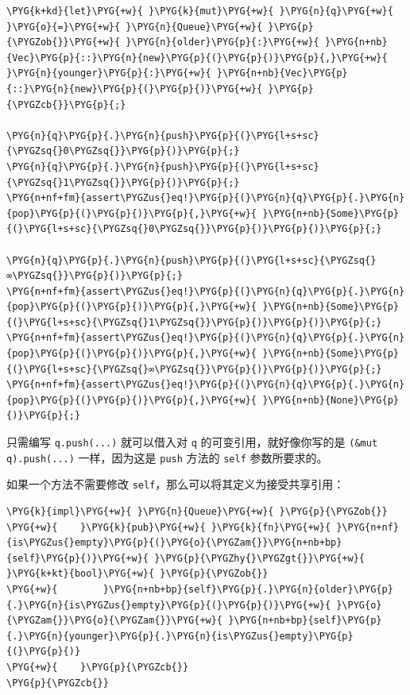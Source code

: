 \begin{Verbatim}[commandchars=\\\{\},breaklines=true,breakanywhere=true,fontsize=\codefont,xleftmargin=17bp]
\PYG{k+kd}{let}\PYG{+w}{ }\PYG{k}{mut}\PYG{+w}{ }\PYG{n}{q}\PYG{+w}{ }\PYG{o}{=}\PYG{+w}{ }\PYG{n}{Queue}\PYG{+w}{ }\PYG{p}{\PYGZob{}}\PYG{+w}{ }\PYG{n}{older}\PYG{p}{:}\PYG{+w}{ }\PYG{n+nb}{Vec}\PYG{p}{::}\PYG{n}{new}\PYG{p}{(}\PYG{p}{)}\PYG{p}{,}\PYG{+w}{ }\PYG{n}{younger}\PYG{p}{:}\PYG{+w}{ }\PYG{n+nb}{Vec}\PYG{p}{::}\PYG{n}{new}\PYG{p}{(}\PYG{p}{)}\PYG{+w}{ }\PYG{p}{\PYGZcb{}}\PYG{p}{;}

\PYG{n}{q}\PYG{p}{.}\PYG{n}{push}\PYG{p}{(}\PYG{l+s+sc}{\PYGZsq{}0\PYGZsq{}}\PYG{p}{)}\PYG{p}{;}
\PYG{n}{q}\PYG{p}{.}\PYG{n}{push}\PYG{p}{(}\PYG{l+s+sc}{\PYGZsq{}1\PYGZsq{}}\PYG{p}{)}\PYG{p}{;}
\PYG{n+nf+fm}{assert\PYGZus{}eq!}\PYG{p}{(}\PYG{n}{q}\PYG{p}{.}\PYG{n}{pop}\PYG{p}{(}\PYG{p}{)}\PYG{p}{,}\PYG{+w}{ }\PYG{n+nb}{Some}\PYG{p}{(}\PYG{l+s+sc}{\PYGZsq{}0\PYGZsq{}}\PYG{p}{)}\PYG{p}{)}\PYG{p}{;}

\PYG{n}{q}\PYG{p}{.}\PYG{n}{push}\PYG{p}{(}\PYG{l+s+sc}{\PYGZsq{}∞\PYGZsq{}}\PYG{p}{)}\PYG{p}{;}
\PYG{n+nf+fm}{assert\PYGZus{}eq!}\PYG{p}{(}\PYG{n}{q}\PYG{p}{.}\PYG{n}{pop}\PYG{p}{(}\PYG{p}{)}\PYG{p}{,}\PYG{+w}{ }\PYG{n+nb}{Some}\PYG{p}{(}\PYG{l+s+sc}{\PYGZsq{}1\PYGZsq{}}\PYG{p}{)}\PYG{p}{)}\PYG{p}{;}
\PYG{n+nf+fm}{assert\PYGZus{}eq!}\PYG{p}{(}\PYG{n}{q}\PYG{p}{.}\PYG{n}{pop}\PYG{p}{(}\PYG{p}{)}\PYG{p}{,}\PYG{+w}{ }\PYG{n+nb}{Some}\PYG{p}{(}\PYG{l+s+sc}{\PYGZsq{}∞\PYGZsq{}}\PYG{p}{)}\PYG{p}{)}\PYG{p}{;}
\PYG{n+nf+fm}{assert\PYGZus{}eq!}\PYG{p}{(}\PYG{n}{q}\PYG{p}{.}\PYG{n}{pop}\PYG{p}{(}\PYG{p}{)}\PYG{p}{,}\PYG{+w}{ }\PYG{n+nb}{None}\PYG{p}{)}\PYG{p}{;}
\end{Verbatim}

只需编写 \texttt{q.push(...)} 就可以借入对 \texttt{q} 的可变引用，就好像你写的是 \texttt{(\&mut q).push(...)} 一样，因为这是 \texttt{push} 方法的 \texttt{self} 参数所要求的。

如果一个方法不需要修改 \texttt{self}，那么可以将其定义为接受共享引用：

\begin{Verbatim}[commandchars=\\\{\},breaklines=true,breakanywhere=true,fontsize=\codefont,xleftmargin=17bp]
\PYG{k}{impl}\PYG{+w}{ }\PYG{n}{Queue}\PYG{+w}{ }\PYG{p}{\PYGZob{}}
\PYG{+w}{    }\PYG{k}{pub}\PYG{+w}{ }\PYG{k}{fn}\PYG{+w}{ }\PYG{n+nf}{is\PYGZus{}empty}\PYG{p}{(}\PYG{o}{\PYGZam{}}\PYG{n+nb+bp}{self}\PYG{p}{)}\PYG{+w}{ }\PYG{p}{\PYGZhy{}\PYGZgt{}}\PYG{+w}{ }\PYG{k+kt}{bool}\PYG{+w}{ }\PYG{p}{\PYGZob{}}
\PYG{+w}{        }\PYG{n+nb+bp}{self}\PYG{p}{.}\PYG{n}{older}\PYG{p}{.}\PYG{n}{is\PYGZus{}empty}\PYG{p}{(}\PYG{p}{)}\PYG{+w}{ }\PYG{o}{\PYGZam{}}\PYG{o}{\PYGZam{}}\PYG{+w}{ }\PYG{n+nb+bp}{self}\PYG{p}{.}\PYG{n}{younger}\PYG{p}{.}\PYG{n}{is\PYGZus{}empty}\PYG{p}{(}\PYG{p}{)}
\PYG{+w}{    }\PYG{p}{\PYGZcb{}}
\PYG{p}{\PYGZcb{}}
\end{Verbatim}

